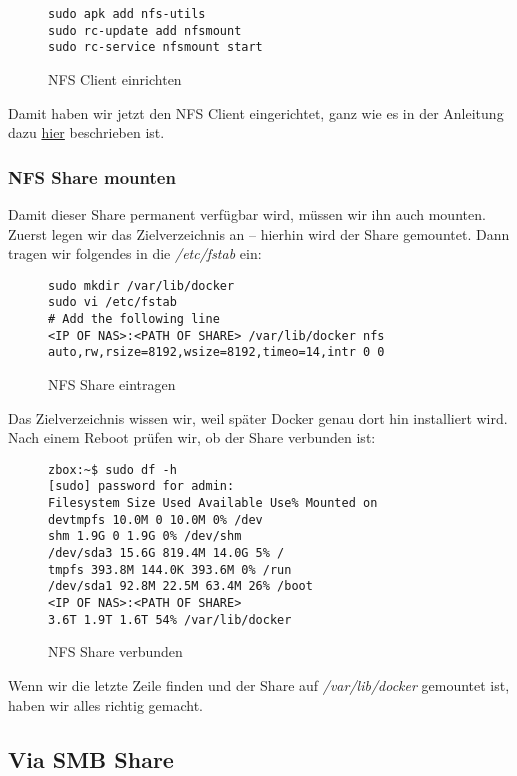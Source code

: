 \documentclass[12pt,a4paper,ngerman]{article}
\newcommand{\code}[1]{\textit{#1}}
\newcommand{\jpacaption}[1]{\caption{#1}\label{fig:#1}}
\begin{document}
\begin{figure}[H]
    \begin{lstlisting}
sudo apk add nfs-utils
sudo rc-update add nfsmount
sudo rc-service nfsmount start
    \end{lstlisting}
    \jpacaption{NFS Client einrichten}
\end{figure}

Damit haben wir jetzt den NFS Client eingerichtet, ganz wie es in der Anleitung
dazu
\href{https://www.hiroom2.com/2017/08/22/alpinelinux-3-6-nfs-utils-client-en/}{hier}
beschrieben ist.

\subsubsection{NFS Share mounten}
Damit dieser Share permanent verfügbar wird, müssen wir ihn auch mounten.
Zuerst legen wir das Zielverzeichnis an -- hierhin wird der Share gemountet.
Dann tragen wir folgendes in die \code{/etc/fstab} ein:

\begin{figure}[H]
    \begin{lstlisting}
sudo mkdir /var/lib/docker
sudo vi /etc/fstab
# Add the following line
<IP OF NAS>:<PATH OF SHARE> /var/lib/docker nfs auto,rw,rsize=8192,wsize=8192,timeo=14,intr 0 0
    \end{lstlisting}
    \jpacaption{NFS Share eintragen}
\end{figure}

Das Zielverzeichnis wissen wir, weil später Docker genau dort hin installiert
wird. Nach einem Reboot prüfen wir, ob der Share verbunden ist:

\begin{figure}[H]
    \begin{lstlisting}
zbox:~$ sudo df -h
[sudo] password for admin:
Filesystem Size Used Available Use% Mounted on
devtmpfs 10.0M 0 10.0M 0% /dev
shm 1.9G 0 1.9G 0% /dev/shm
/dev/sda3 15.6G 819.4M 14.0G 5% /
tmpfs 393.8M 144.0K 393.6M 0% /run
/dev/sda1 92.8M 22.5M 63.4M 26% /boot
<IP OF NAS>:<PATH OF SHARE>
3.6T 1.9T 1.6T 54% /var/lib/docker
    \end{lstlisting}
    \jpacaption{NFS Share verbunden}
\end{figure}

Wenn wir die letzte Zeile finden und der Share auf \code{/var/lib/docker}
gemountet ist, haben wir alles richtig gemacht.

\subsection{Via SMB Share}
\end{document}
